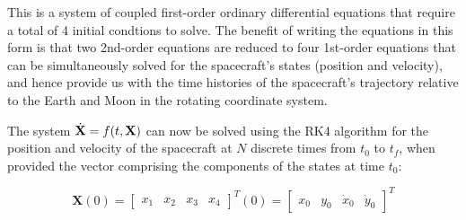 \vspace{\baselineskip}

This is a system of coupled first-order ordinary differential equations that require a total of 4 initial condtions to solve. The benefit of writing the equations in this form is that \color{magenta} two 2nd-order equations are reduced to four 1st-order equations \color{white} that can be simultaneously solved for the spacecraft's states (position and velocity), and hence provide us with the time histories of the spacecraft's trajectory relative to the Earth and Moon in the rotating coordinate system.

\vspace{\baselineskip}

The system $\dot{\bf{X}} = f(t,\bf{X})$ can now be solved using the RK4 algorithm for the position and velocity of the spacecraft at $N$ discrete times from $t_0$ to $t_f$, when provided the vector comprising the components of the states at time $t_0$:

\begin{equation*}
    \textbf{X}(0) =
    \begin{bmatrix}
        x_1 & x_2 & x_3 & x_4
    \end{bmatrix}^T(0)
    =
    \begin{bmatrix}
        x_0 & y_0 & \dot{x}_0 & \dot{y}_0
    \end{bmatrix}^T
\end{equation*}